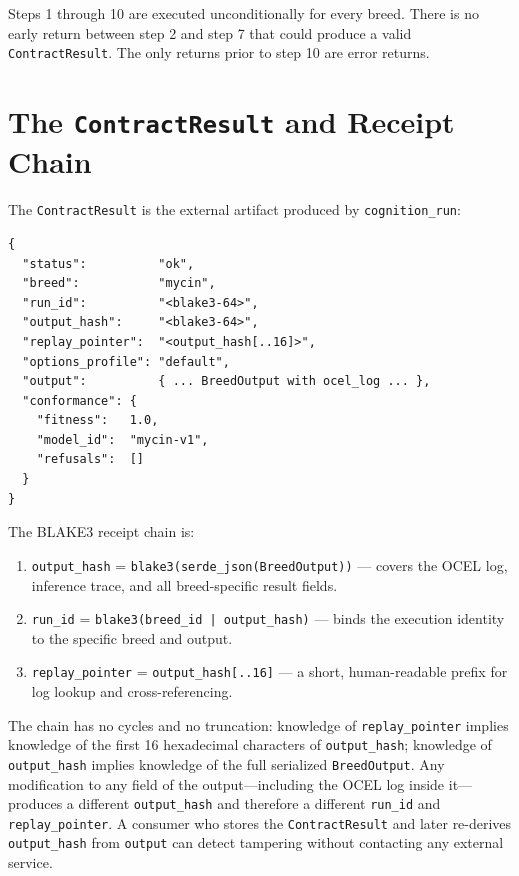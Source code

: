 Steps 1 through 10 are executed unconditionally for every breed. There is no early return between step 2 and step 7 that could produce a valid \texttt{ContractResult}. The only returns prior to step 10 are error returns.

\section{The \texttt{ContractResult} and Receipt Chain}
\label{sec:contract-result}

The \texttt{ContractResult} is the external artifact produced by \texttt{cognition\_run}:

\begin{verbatim}
{
  "status":          "ok",
  "breed":           "mycin",
  "run_id":          "<blake3-64>",
  "output_hash":     "<blake3-64>",
  "replay_pointer":  "<output_hash[..16]>",
  "options_profile": "default",
  "output":          { ... BreedOutput with ocel_log ... },
  "conformance": {
    "fitness":   1.0,
    "model_id":  "mycin-v1",
    "refusals":  []
  }
}
\end{verbatim}

The BLAKE3 receipt chain is:

\begin{enumerate}
\item \texttt{output\_hash} = \texttt{blake3(serde\_json(BreedOutput))} --- covers the OCEL log, inference trace, and all breed-specific result fields.
\item \texttt{run\_id} = \texttt{blake3(breed\_id | output\_hash)} --- binds the execution identity to the specific breed and output.
\item \texttt{replay\_pointer} = \texttt{output\_hash[..16]} --- a short, human-readable prefix for log lookup and cross-referencing.
\end{enumerate}

The chain has no cycles and no truncation: knowledge of \texttt{replay\_pointer} implies knowledge of the first 16 hexadecimal characters of \texttt{output\_hash}; knowledge of \texttt{output\_hash} implies knowledge of the full serialized \texttt{BreedOutput}. Any modification to any field of the output---including the OCEL log inside it---produces a different \texttt{output\_hash} and therefore a different \texttt{run\_id} and \texttt{replay\_pointer}. A consumer who stores the \texttt{ContractResult} and later re-derives \texttt{output\_hash} from \texttt{output} can detect tampering without contacting any external service.

